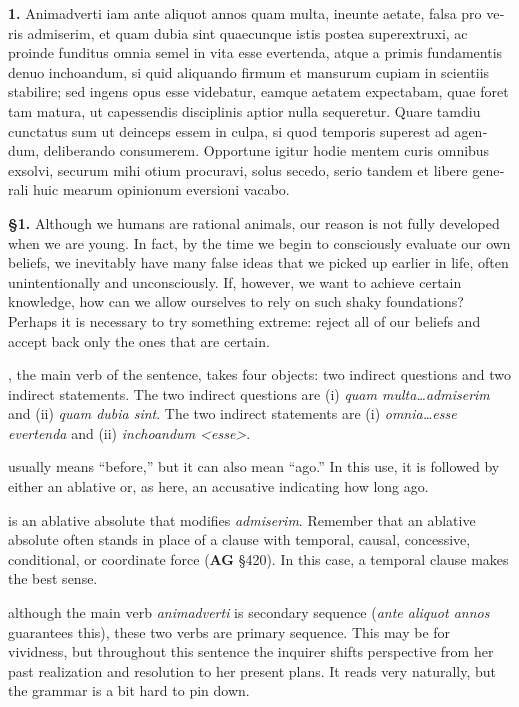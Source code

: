 \beginnumbering
\pstart
\begin{latin}
    \textenglish{\textbf{1.}} Animadverti iam ante aliquot annos quam multa, ineunte aetate, falsa pro veris admiserim, et quam dubia sint quaecunque istis postea superextruxi, ac proinde funditus omnia semel in vita esse evertenda, atque a primis fundamentis denuo inchoandum, si quid aliquando firmum et mansurum cupiam in scientiis stabilire; sed ingens opus esse videbatur, eamque aetatem expectabam, quae foret tam matura, ut capessendis disciplinis aptior nulla sequeretur. Quare tamdiu cunctatus sum ut deinceps essem in culpa, si quod temporis superest ad agendum, deliberando consumerem. Opportune igitur hodie mentem curis omnibus exsolvi, securum mihi otium procuravi, solus secedo, serio tandem et libere generali huic mearum opinionum eversioni vacabo.
\end{latin}
\pend
\endnumbering

\prenotes

\textbf{§1.} Although we humans are rational animals, our reason is not fully developed when we are young. In fact, by the time we begin to consciously evaluate our own beliefs, we inevitably have many false ideas that we picked up earlier in life, often unintentionally and unconsciously. If, however, we want to achieve certain knowledge, how can we allow ourselves to rely on such shaky foundations? Perhaps it is necessary to try something extreme: reject all of our beliefs and accept back only the ones that are certain.

, the main verb of the sentence, takes four objects: two indirect questions and two indirect statements. The two indirect questions are (i) \textit{quam multa\dots admiserim} and (ii) \textit{quam dubia sint}. The two indirect statements are (i) \textit{omnia\dots esse evertenda} and (ii) \textit{inchoandum <esse>}.

 usually means ``before,'' but it can also mean ``ago.'' In this use, it is followed by either an ablative or, as here, an accusative indicating how long ago.

 is an ablative absolute that modifies \textit{admiserim}. Remember that an ablative absolute often stands in place of a clause with temporal, causal, concessive, conditional, or coordinate force (\textbf{AG} §420). In this case, a temporal clause makes the best sense.

 although the main verb \textit{animadverti} is secondary sequence (\textit{ante aliquot annos} guarantees this), these two verbs are primary sequence. This may be for vividness, but throughout this sentence the inquirer shifts perspective from her past realization and resolution to her present plans. It reads very naturally, but the grammar is a bit hard to pin down.

